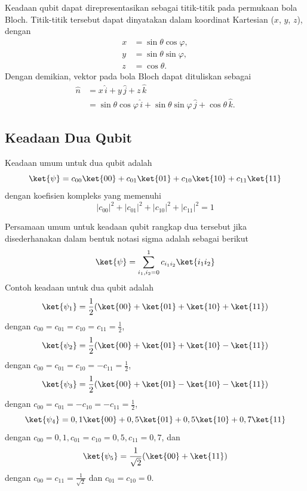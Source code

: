 Keadaan qubit dapat direpresentasikan sebagai titik-titik pada permukaan bola Bloch. Titik-titik tersebut dapat dinyatakan dalam koordinat Kartesian ($x$, $y$, $z$), dengan
\begin{equation}
	\begin{aligned}
		x &= \sin\theta \cos\varphi, \\
		y &= \sin\theta \sin\varphi, \\
		z &= \cos\theta.
	\end{aligned}
\end{equation}
Dengan demikian, vektor pada bola Bloch dapat dituliskan sebagai \cite{pathak2013elements}
\begin{equation}\label{nn}
	\begin{aligned}
		\hat{n} &= x \, \hat{i} + y \, \hat{j} + z \, \hat{k} \\
		&= \sin\theta \cos\varphi \, \hat{i} + \sin\theta \sin\varphi \, \hat{j} + \cos\theta \, \hat{k}.
	\end{aligned}
\end{equation}

\subsection{Keadaan Dua Qubit}
Keadaan umum untuk dua qubit adalah
\begin{equation}
	\ket{\psi}=c_{00}\ket{00}+c_{01}\ket{01}+c_{10}\ket{10}+c_{11}\ket{11}
\end{equation}
dengan koefisien kompleks yang memenuhi
\begin{equation}
    |c_{00}|^2+|c_{01}|^2+|c_{10}|^2+|c_{11}|^2=1
\end{equation}
\par
Persamaan umum untuk keadaan qubit rangkap dua tersebut jika disederhanakan dalam bentuk notasi sigma adalah sebagai berikut
\begin{equation}
    \ket{\psi}=\sum_{i_1,i_2=0}^{1} c_{i_1 i_2} \ket{i_1 i_2}\label{umum2qubit}
\end{equation}
Contoh keadaan untuk dua qubit adalah
\begin{equation}
	\ket{\psi_1}=\frac{1}{2}(\ket{00}+\ket{01}+\ket{10}+\ket{11})
\end{equation}
dengan $c_{00}=c_{01}=c_{10}=c_{11}=\frac{1}{2}$,
\begin{equation}
	\ket{\psi_2}=\frac{1}{2}(\ket{00}+\ket{01}+\ket{10}-\ket{11})
\end{equation}
dengan $c_{00}=c_{01}=c_{10}=-c_{11}=\frac{1}{2}$,
\begin{equation}
	\ket{\psi_3}=\frac{1}{2}(\ket{00}+\ket{01}-\ket{10}-\ket{11})
\end{equation}
dengan $c_{00}=c_{01}=-c_{10}=-c_{11}=\frac{1}{2}$,
\begin{equation}
	\ket{\psi_4}=0,1\ket{00}+0,5\ket{01}+0,5\ket{10}+0,7\ket{11}
\end{equation}
dengan $c_{00}=0,1, c_{01}=c_{10}=0,5, c_{11}=0,7$, dan
\begin{equation}
	\ket{\psi_5}=\frac{1}{\sqrt{2}}(\ket{00}+\ket{11})
\end{equation}
dengan $c_{00}=c_{11}=\frac{1}{\sqrt{2}}$ dan $c_{01}=c_{10}=0$.

